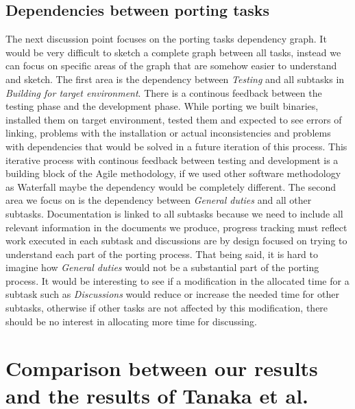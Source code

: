 \subsection{Dependencies between porting tasks}

The next discussion point focuses on the porting tasks dependency graph. It
would be very difficult to sketch a complete graph between all tasks, instead we
can focus on specific areas of the graph that are somehow easier to understand
and sketch. The first area is the dependency between \textit{Testing} and all
subtasks in \textit{Building for target environment}. There is a continous
feedback between the testing phase and the development phase. While porting we
built binaries, installed them on target environment, tested them and expected
to see errors of linking, problems with the installation or actual
inconsistencies and problems with dependencies that would be solved in a future
iteration of this process. This iterative process with continous feedback
between testing and development is a building block of the Agile methodology, if
we used other software methodology as Waterfall maybe the dependency would be
completely different. The second area we focus on is the dependency between
\textit{General duties} and all other subtasks. Documentation is linked to all
subtasks because we need to include all relevant information in the documents we
produce, progress tracking must reflect work executed in each subtask and
discussions are by design focused on trying to understand each part of the
porting process. That being said, it is hard to imagine how \textit{General
duties} would not be a substantial part of the porting process. It would be
interesting to see if a modification in the allocated time for a subtask such
as \textit{Discussions} would reduce or increase the needed time for other
subtasks, otherwise if other tasks are not affected by this modification, there
should be no interest in allocating more time for discussing.

\section{Comparison between our results and the results of Tanaka et al.}


